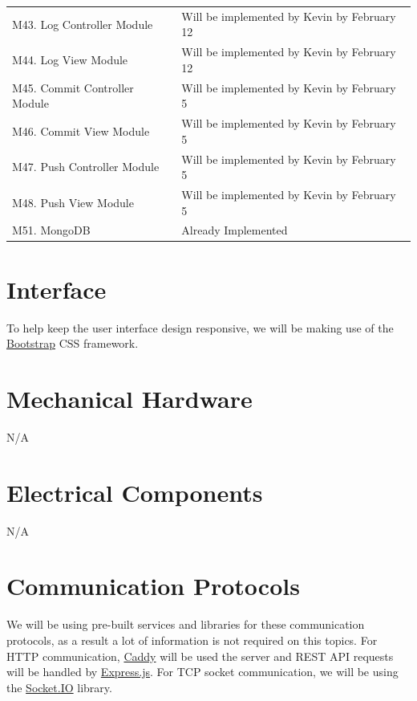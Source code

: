 \documentclass[12pt, titlepage]{article}
\begin{document}
\begin{longtable}{p{} p{}}
		M43. Log Controller Module &  Will be implemented by Kevin by February 12  \\
		M44. Log View Module &  Will be implemented by Kevin by February 12  \\
		M45. Commit Controller Module &  Will be implemented by Kevin by February 5  \\
		M46. Commit View Module &  Will be implemented by Kevin by February 5  \\
		M47. Push Controller Module &  Will be implemented by Kevin by February 5  \\
		M48. Push View Module &  Will be implemented by Kevin by February 5  \\
		M51. MongoDB &  Already Implemented  \\
		\bottomrule
	\end{longtable}
	\normalsize
	
	\newpage{}
	
	\appendix
	
	\section{Interface}
	
	To help keep the user interface design responsive, we will be making use of the \href{https://getbootstrap.com/docs/4.1/getting-started/introduction/}{Bootstrap} CSS framework.
	
	\section{Mechanical Hardware}
	N/A
	
	\section{Electrical Components}
	N/A
	
	\section{Communication Protocols}
	
	We will be using pre-built services and libraries for these communication protocols, as a result a lot of information is not required on this topics. For HTTP communication, \href{https://caddyserver.com/docs/}{Caddy} will be used the server and REST API requests will be handled by \href{https://expressjs.com/en/guide/routing.html}{Express.js}. For TCP socket communication, we will be using the \href{https://socket.io/docs/v4/server-api/}{Socket.IO} library.
	
\end{document}
